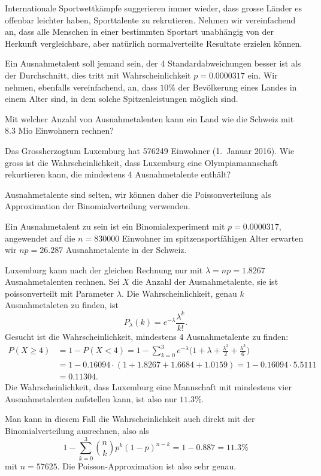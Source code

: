 Internationale Sportwettkämpfe suggerieren immer wieder, dass grosse
Länder es offenbar leichter haben, Sporttalente zu rekrutieren.
Nehmen wir vereinfachend an, dass alle Menschen in einer
bestimmten Sportart unabhängig von der Herkunft vergleichbare,
aber natürlich normalverteilte Resultate erzielen können.

Ein Ausnahmetalent soll jemand sein, der 4 Standardabweichungen besser ist
als der Durchschnitt, dies tritt mit Wahrscheinlichkeit $p = 0.0000317$ ein.
Wir nehmen, ebenfalls vereinfachend, an, dass $10\%$ der Bevölkerung
eines Landes in einem Alter sind, in dem solche Spitzenleistungen
möglich sind.
\begin{teilaufgaben}
\item
Mit welcher Anzahl von Ausnahmetalenten kann ein Land wie die Schweiz mit 
8.3 Mio Einwohnern rechnen?
\item
Das Grossherzogtum Luxemburg hat 576249 Einwohner (1.~Januar 2016).
Wie gross ist die Wahrscheinlichkeit, dass Luxemburg eine Olympiamannschaft
rekurtieren kann, die mindestens 4 Ausnahmetalente enthält?
\end{teilaufgaben}


\begin{loesung}
Ausnahmetalente sind selten, wir können daher die Poissonverteilung als
Approximation der Binomialverteilung verwenden.
\begin{teilaufgaben}
\item
Ein Ausnahmetalent zu sein ist ein Binomialexperiment mit $p=0.0000317$,
angewendet auf die $n=830000$ Einwohner im spitzensportfähigen Alter
erwarten wir $np=26.287$ Ausnahmetalente in der Schweiz.
\item
Luxemburg kann nach der gleichen Rechnung nur mit $\lambda=np=1.8267$
Ausnahmetalenten rechnen.
Sei $X$ die Anzahl der Ausnahmetalente, sie ist poissonverteilt mit
Parameter $\lambda$.
Die Wahrscheinlichkeit, genau $k$ Ausnahmetaleten zu finden, ist
\[
P_\lambda(k)=e^{-\lambda}\frac{\lambda^k}{k!}.
\]
Gesucht ist die Wahrscheinlichkeit, mindestens 4 Ausnahmetalente zu finden:
\begin{align*}
P(X \ge 4)
&=
1-P(X<4)=1-\sum_{k=0}^3 e^{-\lambda}\biggl(
1+\lambda+ \frac{\lambda^2}{2} + \frac{\lambda^3}{6}
\biggr)
\\
&=
1-0.16094\cdot(1+1.8267+1.6684+1.0159)
=
1-0.16094\cdot 5.5111\\
&=
0.11304.
\end{align*}
Die Wahrscheinlichkeit, dass Luxemburg eine Mannschaft mit mindestens
vier Ausnahmetalenten aufstellen kann, ist also nur $11.3\%$.

Man kann in diesem Fall die Wahrscheinlichkeit auch direkt mit der
Binomialverteilung ausrechnen, also als
\[
1-\sum_{k=0}^3\binom{n}{k}p^k(1-p)^{n-k}
=
1-0.887 = 11.3\%
\]
mit $n=57625$.
Die Poisson-Approximation ist also sehr genau.
\qedhere
\end{teilaufgaben}
\end{loesung}

